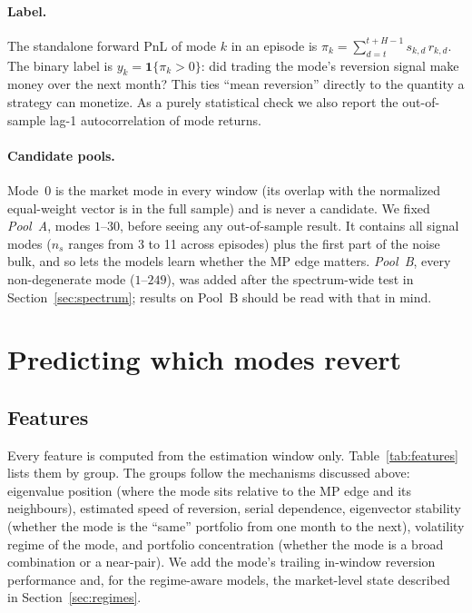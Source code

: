 \paragraph{Label.} The standalone forward PnL of mode $k$ in an episode
is $\pi_k=\sum_{d=t}^{t+H-1}s_{k,d}\,r_{k,d}$. The binary label is
$y_k=\mathbf 1\{\pi_k>0\}$: did trading the mode's reversion signal make
money over the next month? This ties ``mean reversion'' directly to the
quantity a strategy can monetize. As a purely statistical check we
also report the out-of-sample lag-1 autocorrelation of mode returns.

\paragraph{Candidate pools.} Mode~0 is the market mode in every window
(its overlap with the normalized equal-weight vector is
\FullOverlap{} in the full sample) and is never a candidate. We fixed
\emph{Pool~A}, modes $1$--$30$, before seeing any out-of-sample
result. It contains all signal modes ($n_s$ ranges from 3 to 11 across
episodes) plus the first part of the noise bulk, and so lets the models
learn whether the MP edge matters. \emph{Pool~B}, every non-degenerate
mode ($1$--$249$), was added after the spectrum-wide test in
Section~\ref{sec:spectrum}; results on Pool~B should be read with that
in mind.

\section{Predicting which modes revert}
\label{sec:ml}

\subsection{Features}

Every feature is computed from the estimation window only.
Table~\ref{tab:features} lists them by group. The groups follow the
mechanisms discussed above: eigenvalue position (where the mode sits
relative to the MP edge and its neighbours), estimated speed of
reversion, serial dependence, eigenvector stability (whether the mode
is the ``same'' portfolio from one month to the next), volatility
regime of the mode, and portfolio concentration (whether the mode is a
broad combination or a near-pair). We add the mode's trailing
in-window reversion performance and, for the regime-aware models, the
market-level state described in Section~\ref{sec:regimes}.

